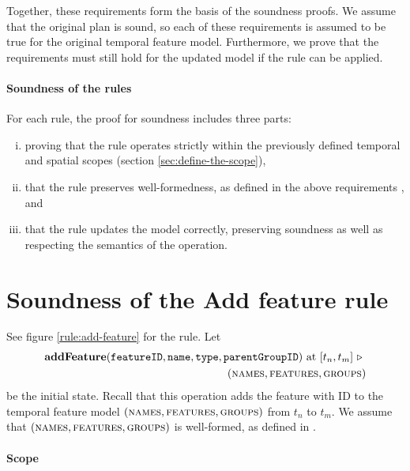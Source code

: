 Together, these requirements form the basis of the soundness proofs. We assume that the original plan is sound, so each of these requirements is assumed to be true for the original temporal feature model. Furthermore, we prove that the requirements must still hold for the updated model if the rule can be applied.

\paragraph{Soundness of the rules}
For each rule, the proof for soundness includes three parts: 
\begin{enumerate}[(i)]
   \item proving that the rule operates strictly within the previously defined temporal and spatial scopes (section \vref{sec:define-the-scope}), 
   \item that the rule preserves well-formedness, as defined in the above requirements , and
   \item that the rule updates the model correctly, preserving soundness as well as respecting the semantics of the operation.
\end{enumerate}

\section{Soundness of the Add feature rule}
\label{sec:soundness-of-the-add-feature-rule}

See figure \vref{rule:add-feature} for the  rule.
Let 
\begin{equation*}
   \begin{split}
      \textbf{addFeature}(\var{featureID}, \var{name}, \var{type}, \var{parentGroupID})\text{ at }\interval{t_n}{t_m}
      \shove \\
   (\names{}, \features{}, \groups{})
\end{split}
\end{equation*}
be the initial state. Recall that this operation adds the feature with ID  to the temporal feature model $(\textsc{names}{}, \textsc{features}{}, \textsc{groups}{}{})$ from $t_n$ to $t_m$. We assume that $(\textsc{names}{}, \textsc{features}{}, \textsc{groups}{}{})$ is well-formed, as defined in .

\paragraph{Scope} 

